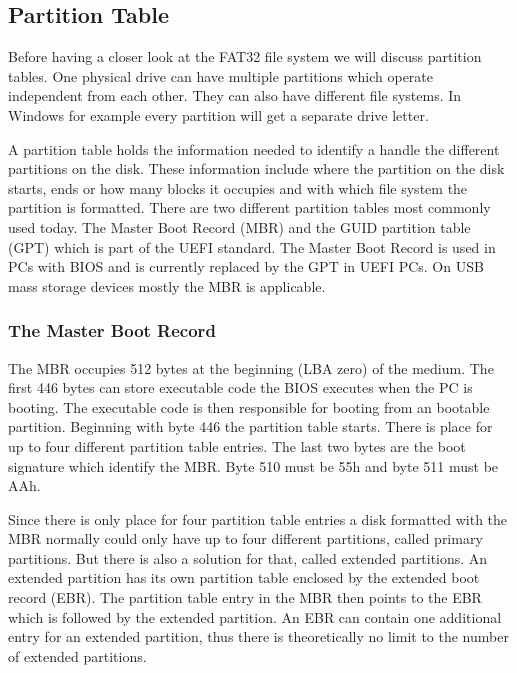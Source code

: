 \subsection{Partition Table}

Before having a closer look at the FAT32 file system we will discuss partition tables. One physical drive can have multiple partitions which operate independent from each other. They can also have different file systems. In Windows for example every partition will get a separate drive letter.

A partition table holds the information needed to identify a handle the different partitions on the disk. These information include where the partition on the disk starts, ends or how many blocks it occupies and with which file system the partition is formatted. There are two different partition tables most commonly used today. The Master Boot Record (MBR) and the GUID partition table (GPT) which is part of the UEFI standard\cite{wiki_guid}. The Master Boot Record is used in PCs with BIOS and is currently replaced by the GPT in UEFI PCs. On USB mass storage devices mostly the MBR is applicable. 

\subsubsection{The Master Boot Record}

The MBR occupies 512 bytes at the beginning (LBA zero) of the medium. The first 446 bytes can store executable code the BIOS executes when the PC is booting. The executable code is then responsible for booting from an bootable partition. Beginning with byte 446 the partition table starts. There is place for up to four different partition table entries. The last two bytes are the boot signature which identify the MBR. Byte 510 must be 55h and byte 511 must be AAh.

Since there is only place for four partition table entries a disk formatted with the MBR normally could only have up to four different partitions, called primary partitions. But there is also a solution for that, called extended partitions. An extended partition has its own partition table enclosed by the extended boot record (EBR). The partition table entry in the MBR then points to the EBR which is followed by the extended partition. An EBR can contain one additional entry for an extended partition, thus there is theoretically no limit to the number of extended partitions\cite{usb_ms_jan}.

